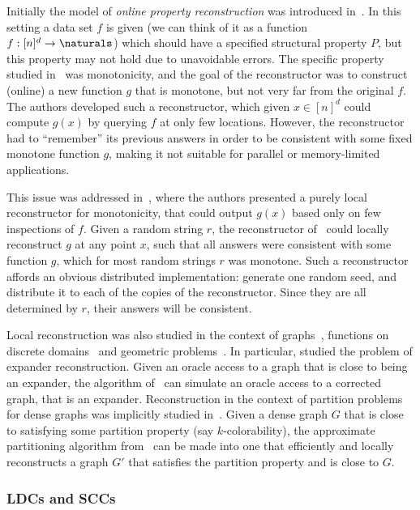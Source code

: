 Initially the model of \emph{online property reconstruction} was introduced in~\cite{datarecon}. In this setting a data set $f$ is given (we can think of it as a function $f:[n]^d \to \naturals$) which should have a specified structural property $P$, but this property may not
hold due to unavoidable errors.
The specific property studied in~\cite{datarecon} was monotonicity, and the goal of the reconstructor was to construct (online) a new function $g$ that is monotone, but not very far from the original $f$. The authors developed such a reconstructor, which given $x \in [n]^d$ could compute $g(x)$ by querying $f$ at only few locations. However, the reconstructor had to ``remember'' its previous answers in order to be consistent with some fixed monotone function $g$, making it not suitable for parallel or memory-limited applications.

This issue was addressed in~\cite{monorecon}, where the authors
presented a purely local reconstructor for monotonicity, that could output $g(x)$ based only on few inspections of $f$. Given a random string $r$, the reconstructor of~\cite{monorecon} could locally reconstruct $g$ at any point $x$, such that all answers were consistent with some function $g$, which for most random strings $r$ was monotone.
Such a reconstructor affords an obvious
distributed implementation: generate one random seed, and distribute it to each of
the copies of the reconstructor. Since they are all determined by $r$, their answers will be consistent.

Local reconstruction was also studied in the context of 
graphs~\cite{exprecon,ggr}, 
functions on discrete domains~\cite{lb_recon,lip_recon} and geometric problems~\cite{geomrecon}. In particular, \cite{exprecon} studied the problem of expander reconstruction. Given an oracle access to a graph that is close to being an expander, the algorithm of~\cite{exprecon} can simulate an oracle access to a corrected graph, that is an expander. Reconstruction in the context of partition problems for dense graphs was implicitly studied in~\cite{ggr}. Given a dense graph $G$ that is close to satisfying some partition property (say $k$-colorability),
the approximate partitioning algorithm from~\cite{ggr} can be made into one that efficiently and locally reconstructs a graph $G'$ that satisfies the partition property and is close to $G$.

\subsubsection{LDCs and SCCs}

